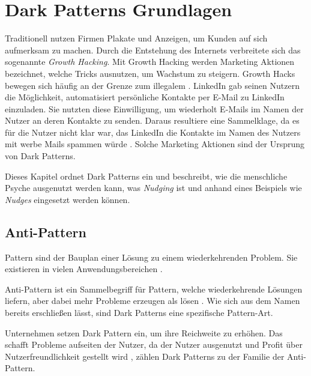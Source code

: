 \documentclass[conference,compsoc,final,a4paper]{IEEEtran}
\begin{document}
\section{Dark Patterns Grundlagen}

Traditionell nutzen Firmen Plakate und Anzeigen, um Kunden auf sich aufmerksam zu machen. Durch die Entstehung des Internets verbreitete sich das sogenannte \textit{Growth Hacking}. Mit Growth Hacking werden Marketing Aktionen bezeichnet, welche Tricks ausnutzen, um Wachstum zu steigern. Growth Hacks bewegen sich häufig an der Grenze zum illegalem  \autocite{Narayanan2020}. LinkedIn gab seinen Nutzern die Möglichkeit, automatisiert persönliche Kontakte per E-Mail zu LinkedIn einzuladen. Sie nutzten diese Einwilligung, um wiederholt E-Mails im Namen der Nutzer an deren Kontakte zu senden. Daraus resultiere eine Sammelklage, da es für die Nutzer nicht klar war, das LinkedIn die Kontakte im Namen des Nutzers mit werbe Mails spammen würde \autocite{Strange2015}. Solche Marketing Aktionen sind der Ursprung von Dark Patterns.

Dieses Kapitel ordnet Dark Patterns ein und beschreibt, wie die menschliche Psyche ausgenutzt werden kann, was \textit{Nudging} ist und anhand eines Beispiels wie \textit{Nudges} eingesetzt werden können.
\subsection{Anti-Pattern}
Pattern sind der Bauplan einer Lösung zu einem wiederkehrenden Problem. Sie existieren in vielen Anwendungsbereichen \autocite[S. 1]{MacDonald2019}.

Anti-Pattern ist ein Sammelbegriff für Pattern, welche wiederkehrende Lösungen liefern, aber dabei mehr Probleme erzeugen als lösen \autocite[S. 193-195]{MacDonald2019}. Wie sich aus dem Namen bereits erschließen lässt, sind Dark Patterns eine spezifische Pattern-Art.

Unternehmen setzen Dark Pattern ein, um ihre Reichweite zu erhöhen. Das schafft Probleme aufseiten der Nutzer, da der Nutzer ausgenutzt und Profit über Nutzerfreundlichkeit gestellt wird \autocite{Chivukula_2019}, zählen Dark Patterns zu der Familie der Anti-Pattern.
\end{document}
